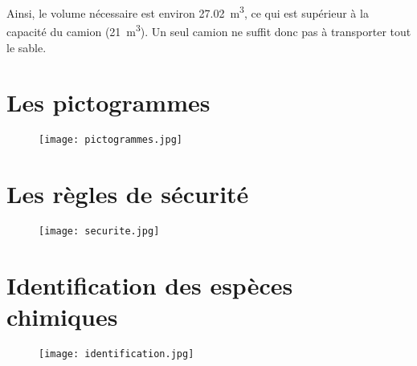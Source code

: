 \documentclass[a4paper,12pt]{article}
\begin{document}
Ainsi, le volume nécessaire est environ \SI{27.02}{m^3}, ce qui est supérieur à la capacité du camion (\SI{21}{m^3}). Un seul camion ne suffit donc pas à transporter tout le sable.


\section{Les pictogrammes}

\begin{figure}[H]
  \centering
  \texttt{[image: pictogrammes.jpg]}
  \label{Les pictogrammes}
\end{figure}

\section{Les règles de sécurité}

\begin{figure}[H]
  \centering
  \texttt{[image: securite.jpg]}
  \label{Les règles de sécurité}
\end{figure}

\section{Identification des espèces chimiques}

\begin{figure}[H]
  \centering
  \texttt{[image: identification.jpg]}
  \label{Identification d'espèces chimiques}
\end{figure}
\end{document}
